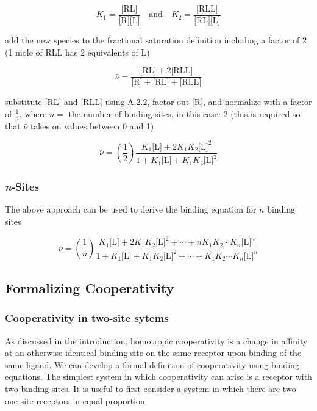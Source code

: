 \begin{equation}
K_1 = \frac{\text{[RL]}}{\text{[R][L]}} \quad \text{and} \quad K_2 = \frac{\text{[RLL]}}{\text{[RL][L]}}
\end{equation}

add the new species to the fractional saturation definition including a factor of 2 (1 mole of RLL has 2 equivalents of L)

\begin{equation}
	\bar{\nu} = \frac{\text{[RL]} + 2 \text{[RLL]}}{\text{[R]} + \text{[RL]} + \text{[RLL]}}
\end{equation}

substitute [RL] and [RLL] using A.2.2, factor out [R], and normalize with a factor of \(\frac{1}{n}\), where \(n = \) the number of binding sites, in this case: 2 (this is required so that \(\bar{\nu}\) takes on values between 0 and 1)

\begin{equation}
	\bar{\nu} = \left(\frac{1}{2}\right) \frac{K_1 \text{[L]} + 2 K_1 K_2 \text{[L]}^2}{1 + K_1 \text{[L]} + K_1 K_2 \text{[L]}^2}
\end{equation}

\subsubsection*{\emph{n}-Sites}

The above approach can be used to derive the binding equation for \(n\) binding sites

\begin{equation}
	\bar{\nu} = \left(\frac{1}{n}\right) \frac{K_1 \text{[L]} + 2 K_1 K_2 \text{[L]}^2 + \cdots + n K_1 K_2 \cdots K_n \text{[L]}^n}{1 + K_1 \text{[L]} + K_1 K_2 \text{[L]}^2 + \cdots + K_1 K_2 \cdots K_n \text{[L]}^n}
\end{equation}

\subsection{Formalizing Cooperativity}

\subsubsection*{Cooperativity in two-site sytems}

As discussed in the introduction, homotropic cooperativity is a change in affinity at an otherwise identical binding site on the same receptor upon binding of the same ligand. We can develop a formal definition of cooperativity using binding equations. The simplest system in which cooperativity can arise is a receptor with two binding sites. It is useful to first consider a system in which there are two one-site receptors in equal proportion

